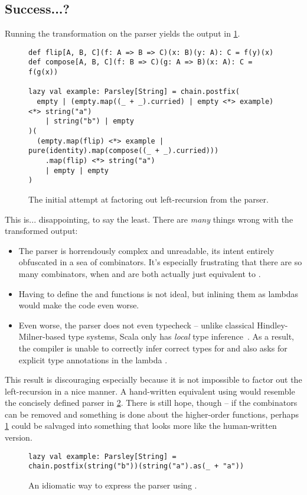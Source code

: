 \documentclass[../../main.tex]{subfiles}
\begin{document}
\subsection{Success...?}
Running the transformation on the  parser yields the output in \cref{fig:leftrec-example-bad}.
%
\begin{figure}[htbp]
\begin{verbatim}
def flip[A, B, C](f: A => B => C)(x: B)(y: A): C = f(y)(x)
def compose[A, B, C](f: B => C)(g: A => B)(x: A): C = f(g(x))

lazy val example: Parsley[String] = chain.postfix(
  empty | (empty.map((_ + _).curried) | empty <*> example) <*> string("a")
    | string("b") | empty
)(
  (empty.map(flip) <*> example | pure(identity).map(compose((_ + _).curried)))
    .map(flip) <*> string("a")
    | empty | empty
)
\end{verbatim}
\caption{The initial attempt at factoring out left-recursion from the  parser.}
\label{fig:leftrec-example-bad}
\end{figure}

This is... disappointing, to say the least.
There are \emph{many} things wrong with the transformed output:
\begin{itemize}
  \item The parser is horrendously complex and unreadable, its intent entirely obfuscated in a sea of combinators. It's especially frustrating that there are so many  combinators, when  and  are both actually just equivalent to .
  \item Having to define the  and  functions is not ideal, but inlining them as lambdas would make the code even worse.
  \item Even worse, the parser does not even typecheck -- unlike classical Hindley-Milner-based type systems, Scala only has \emph{local} type inference~\cite{cremet_core_2006}. As a result, the compiler is unable to correctly infer correct types for  and also asks for explicit type annotations in the lambda .
\end{itemize}
This result is discouraging especially because it is not impossible to factor out the left-recursion in a nice manner.
A hand-written equivalent using  would resemble the concisely defined parser in \cref{fig:leftrec-example-hand}.
There is still hope, though -- if the  combinators can be removed and something is done about the higher-order functions, perhaps \cref{fig:leftrec-example-bad} could be salvaged into something that looks more like the human-written version.

\begin{figure}[htbp]
\begin{verbatim}
lazy val example: Parsley[String] = chain.postfix(string("b"))(string("a").as(_ + "a"))
\end{verbatim}
\caption{An idiomatic way to express the  parser using .}
\label{fig:leftrec-example-hand}
\end{figure}
\end{document}
